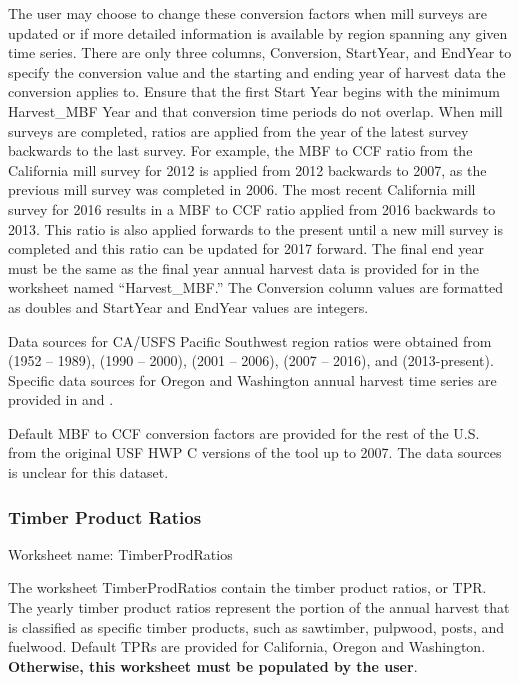 \documentclass[
  openany]{book}
\begin{document}
The user may choose to change these conversion factors when mill surveys are updated or if more detailed information is available by region spanning any given time series. There are only three columns, Conversion, StartYear, and EndYear to specify the conversion value and the starting and ending year of harvest data the conversion applies to. Ensure that the first Start Year begins with the minimum Harvest\_MBF Year and that conversion time periods do not overlap. When mill surveys are completed, ratios are applied from the year of the latest survey backwards to the last survey. For example, the MBF to CCF ratio from the California mill survey for 2012 is applied from 2012 backwards to 2007, as the previous mill survey was completed in 2006. The most recent California mill survey for 2016 results in a MBF to CCF ratio applied from 2016 backwards to 2013. This ratio is also applied forwards to the present until a new mill survey is completed and this ratio can be updated for 2017 forward. The final end year must be the same as the final year annual harvest data is provided for in the worksheet named ``Harvest\_MBF.'' The Conversion column values are formatted as doubles and StartYear and EndYear values are integers.

Data sources for CA/USFS Pacific Southwest region ratios were obtained from \textcite{keegan2010} (1952 -- 1989), \textcite{morgan2004} (1990 -- 2000), \textcite{morgan2012} (2001 -- 2006), \textcite{mciver2015} (2007 -- 2016), and \textcite{marcille2020} (2013-present). Specific data sources for Oregon and Washington annual harvest time series are provided in \textcite{morgan2021} and \textcite{nichols2020}.

Default MBF to CCF conversion factors are provided for the rest of the U.S. from the original USF HWP C versions of the tool up to 2007. The data sources is unclear for this dataset.

\hypertarget{own-prov-input-tpr}{%
\subsubsection{Timber Product Ratios}\label{own-prov-input-tpr}}

Worksheet name: TimberProdRatios

The worksheet TimberProdRatios contain the timber product ratios, or TPR. The yearly timber product ratios represent the portion of the annual harvest that is classified as specific timber products, such as sawtimber, pulpwood, posts, and fuelwood. Default TPRs are provided for California, Oregon and Washington. \textbf{Otherwise, this worksheet must be populated by the user}.
\end{document}
